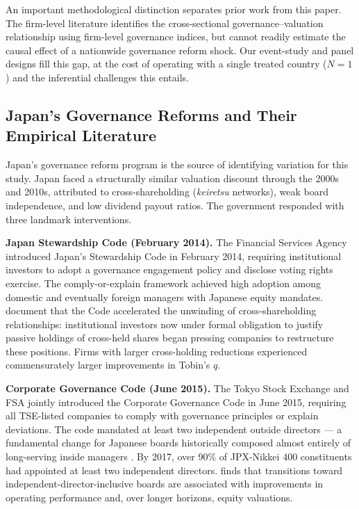 \documentclass[12pt]{article}
\begin{document}
An important methodological distinction separates prior work from this paper. The firm-level
literature identifies the cross-sectional governance--valuation relationship using firm-level
governance indices, but cannot readily estimate the causal effect of a nationwide governance
reform shock. Our event-study and panel designs fill this gap, at the cost of operating with
a single treated country ($N=1$) and the inferential challenges this entails.

\subsection{Japan's Governance Reforms and Their Empirical Literature}

Japan's governance reform program is the source of identifying variation for this study.
Japan faced a structurally similar valuation discount through the 2000s and 2010s, attributed
to cross-shareholding (\textit{keiretsu} networks), weak board independence, and low dividend
payout ratios. The government responded with three landmark interventions.

\textbf{Japan Stewardship Code (February 2014).} The Financial Services Agency introduced
Japan's Stewardship Code in February 2014, requiring institutional investors to adopt a
governance engagement policy and disclose voting rights exercise. The comply-or-explain
framework achieved high adoption among domestic and eventually foreign managers with Japanese
equity mandates. \citet{miyajima2023} document that the Code accelerated the unwinding of
cross-shareholding relationships: institutional investors now under formal obligation to
justify passive holdings of cross-held shares began pressing companies to restructure these
positions. Firms with larger cross-holding reductions experienced commensurately larger
improvements in Tobin's $q$.

\textbf{Corporate Governance Code (June 2015).} The Tokyo Stock Exchange and FSA jointly
introduced the Corporate Governance Code in June 2015, requiring all TSE-listed companies to
comply with governance principles or explain deviations. The code mandated at least two
independent outside directors --- a fundamental change for Japanese boards historically
composed almost entirely of long-serving inside managers \citep{eberhart2012}. By 2017,
over 90\% of JPX-Nikkei 400 constituents had appointed at least two independent directors.
\citet{eberhart2012} finds that transitions toward independent-director-inclusive boards are
associated with improvements in operating performance and, over longer horizons, equity
valuations.
\end{document}
